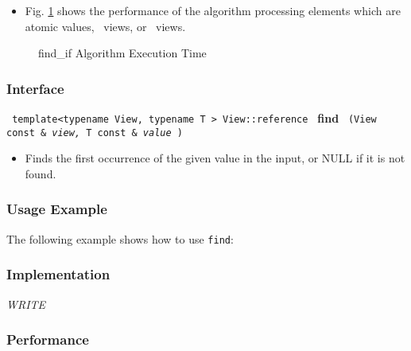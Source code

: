 \begin{itemize}
\item
Fig. \ref{fig:find-if-alg-exec-exper}
shows the performance of the algorithm processing
elements which are atomic values, \stl\ views, or \stapl\ views.
\end{itemize}

\begin{figure}[p]
\caption{find\_if Algorithm Execution Time}
\label{fig:find-if-alg-exec-exper}
\end{figure}

 
\subsubsection{Interface} %

\noindent
\texttt{%
template<typename View, typename T >
\newline
View::reference 
}
\newline
\textbf{find}%
\texttt{%
(View const \&
\textit{view,}%
T const \&
\textit{value}%
)
}

\begin{itemize}
\item
Finds the first occurrence of the given value in the input, or NULL if it is not found. 
\end{itemize}

\subsubsection{Usage Example} %

The following example shows how to use \texttt{find}:


\subsubsection{Implementation} %

\textit{WRITE}

\subsubsection{Performance} %

